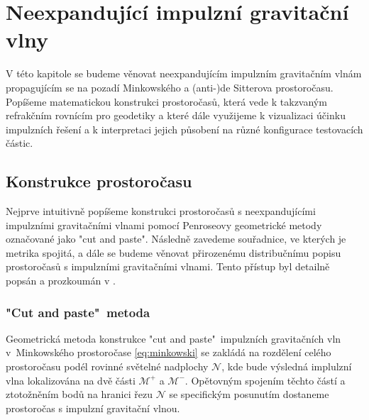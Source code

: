\chapter{Neexpandující impulzní gravitační vlny}
V této kapitole se budeme věnovat neexpandujícím impulzním gravitačním vlnám propagujícím se na pozadí Minkowského a (anti-)de Sitterova
prostoročasu. Popíšeme matematickou konstrukci prostoročasů, která vede k takzvaným refrakčním rovnícím pro geodetiky a které dále využijeme k vizualizaci účinku
impulzních řešení a k interpretaci jejich působení na různé konfigurace testovacích částic.


\section{Konstrukce prostoročasu}
Nejprve intuitivně popíšeme konstrukci prostoročasů s neexpandujícími impulzními gravitačními vlnami
pomocí Penroseovy geometrické metody \cite{Penrose:1972xrn} označované jako "cut and paste". Následně zavedeme souřadnice, ve
kterých je metrika spojitá, a dále se budeme věnovat přirozenému distribučnímu popisu prostoročasů s impulzními gravitačními
vlnami. Tento přístup byl detailně popsán a prozkoumán v \cite{Podolsky:2014ysa}.

\subsection{"Cut and paste"\ metoda}
\label{sec:cut_and_paste_konstrukce1}
Geometrická metoda konstrukce "cut and paste"\ impulzních gravitačních vln v~Minkowského prostoročase \eqref{eq:minkowski} se zakládá na rozdělení celého prostoročasu podél rovinné
světelné nadplochy $\mathcal{N}$, kde bude výsledná implulzní vlna lokalizována na dvě části $\mathcal{M}^+$ a $\mathcal{M}^-$. Opětovným spojením těchto částí a ztotožněním bodů na hranici
řezu $\mathcal{N}$ se specifickým posunutím dostaneme prostoročas s impulzní gravitační vlnou.

